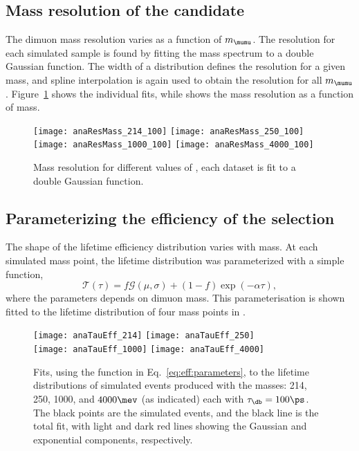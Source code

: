 \subsection{Mass resolution of the \db candidate}
The dimuon mass resolution varies as a function of $m_\mumu$.
The resolution for each simulated sample is found by fitting the mass spectrum to a
double Gaussian function.
The width of a distribution defines the resolution for a given mass, and spline interpolation is
again used to obtain the resolution for all $m_\mumu$.
Figure~\ref{fig:massres} shows the individual fits, while  shows
the mass resolution as a function of mass.


\begin{figure}
  \begin{center}
    \texttt{[image: anaResMass\_214\_100]}
    \texttt{[image: anaResMass\_250\_100]}
    \texttt{[image: anaResMass\_1000\_100]}
    \texttt{[image: anaResMass\_4000\_100]}
  \end{center}
  \caption{
    Mass resolution for different values of \mdb, each dataset is fit to a double Gaussian
    function.
  }
  \label{fig:massres}
\end{figure}


\subsection{Parameterizing the efficiency of the \db selection}
The shape of the lifetime efficiency distribution varies with mass.
At each simulated mass point, the lifetime distribution was parameterized with a simple function,
\begin{equation}
  \mathcal{T}(\tau) = f\mathcal{G}(\mu, \sigma) + (1-f)\exp\left(-\alpha\tau\right),
  \label{eq:eff:parameters}
\end{equation}
where the parameters depends on dimuon mass.
This parameterisation is shown fitted to the lifetime distribution of four mass points in
.


\begin{figure}
  \begin{center}
    \texttt{[image: anaTauEff\_214]}
    \texttt{[image: anaTauEff\_250]}\\
    \texttt{[image: anaTauEff\_1000]}
    \texttt{[image: anaTauEff\_4000]}
    \caption{\small
      Fits, using the function in Eq.~\protect\ref{eq:eff:parameters},
      to the lifetime distributions of simulated events produced with the masses:
      214, 250, 1000, and $4000\mev$ (as indicated)
      each with $\tau_\db=100\ps$.
      The black points are the simulated events, and the black line is the total fit, with light
      and dark red lines showing the Gaussian and exponential components, respectively.
    }
    \label{fig:eff:fits}
  \end{center}
\end{figure}



